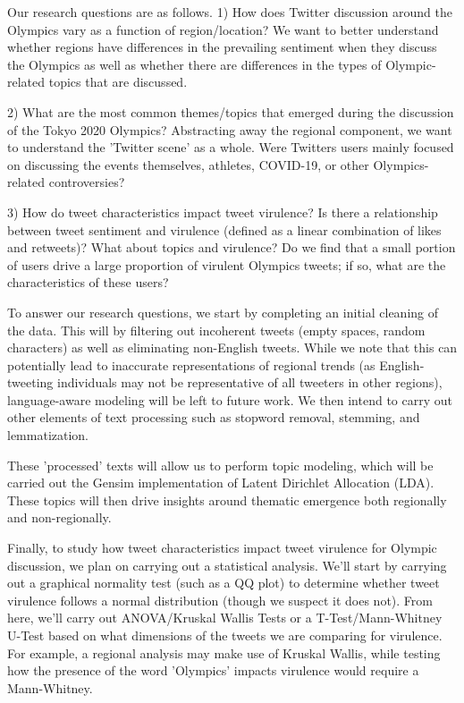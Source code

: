 \documentclass[letterpaper]{article} %
\begin{document}
Our research questions are as follows. 1) How does Twitter discussion around the Olympics vary as a function of region/location? We want to better understand whether regions have differences in the prevailing sentiment when they discuss the Olympics as well as whether there are differences in the types of Olympic-related topics that are discussed.

2) What are the most common themes/topics that emerged during the discussion of the Tokyo 2020 Olympics? Abstracting away the regional component, we want to understand the 'Twitter scene' as a whole. Were Twitters users mainly focused on discussing the events themselves, athletes, COVID-19, or other Olympics-related controversies?

3) How do tweet characteristics impact tweet virulence? Is there a relationship between tweet sentiment and virulence (defined as a linear combination of likes and retweets)? What about topics and virulence? Do we find that a small portion of users drive a large proportion of virulent Olympics tweets; if so, what are the characteristics of these users?

To answer our research questions, we start by completing an initial cleaning of the data. This will by filtering out incoherent tweets (empty spaces, random characters) as well as eliminating non-English tweets. While we note that this can potentially lead to inaccurate representations of regional trends (as English-tweeting individuals may not be representative of all tweeters in other regions), language-aware modeling will be left to future work. We then intend to carry out other elements of text processing such as stopword removal, stemming, and lemmatization. 

These 'processed' texts will allow us to perform topic modeling, which will be carried out the Gensim implementation of Latent Dirichlet Allocation (LDA). These topics will then drive insights around thematic emergence both regionally and non-regionally.

Finally, to study how tweet characteristics impact tweet virulence for Olympic discussion, we plan on carrying out a statistical analysis. We'll start by carrying out a graphical normality test (such as a QQ plot) to determine whether tweet virulence follows a normal distribution (though we suspect it does not). From here, we'll carry out ANOVA/Kruskal Wallis Tests or a T-Test/Mann-Whitney U-Test based on what dimensions of the tweets we are comparing for virulence. For example, a regional analysis may make use of Kruskal Wallis, while testing how the presence of the word 'Olympics' impacts virulence would require a Mann-Whitney. 
\end{document}
